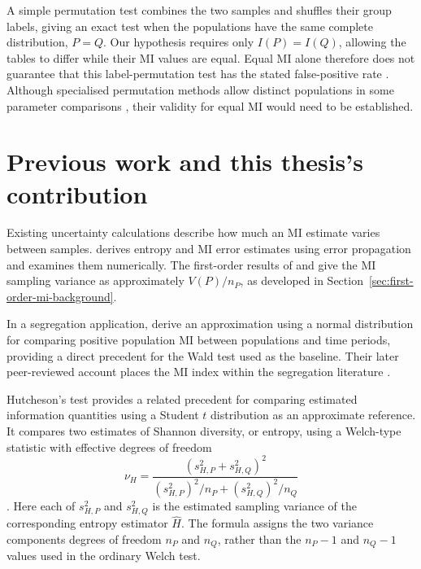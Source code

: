 A simple permutation test combines the two samples and shuffles their
group labels, giving an exact test when the populations have the same
complete distribution, \(P=Q\). Our hypothesis requires only
\(I(P)=I(Q)\), allowing the tables to differ while their MI values are
equal. Equal MI alone therefore does not guarantee that this label-permutation test
has the stated false-positive rate \citep{chung2013}.
Although specialised permutation methods allow distinct populations in
some parameter comparisons \citep{janssen1997,chung2013}, their validity
for equal MI would need to be established.

\section{Previous work and this thesis's contribution}

Existing uncertainty calculations describe how much an MI estimate varies
between samples. \citet{roulston1999} derives entropy and MI error estimates
using error propagation and examines them numerically. The first-order
results of \citet{moddemeijer1989} and \citet{brillinger2004} give the MI
sampling variance as approximately \(V(P)/n_P\), as developed in
Section~\ref{sec:first-order-mi-background}.

In a segregation application, \citet{mora2009} derive an approximation using
a normal distribution for comparing positive population MI between
populations and time periods, providing a direct precedent for the Wald
test used as the baseline. Their later
peer-reviewed account places the MI index within the segregation literature
\citep{mora2011}.

Hutcheson's test provides a related precedent for comparing estimated
information quantities using a Student \(t\) distribution as an approximate
reference. It compares two estimates of Shannon diversity, or entropy,
using a Welch-type statistic with effective degrees of freedom
\begin{equation}
  \nu_H=
  \frac{(s_{H,P}^2+s_{H,Q}^2)^2}
       {(s_{H,P}^2)^2/n_P+(s_{H,Q}^2)^2/n_Q}
  \label{eq:hutcheson-df}
\end{equation}
\citep{hutcheson1970}. Here each of
\(s_{H,P}^2\) and \(s_{H,Q}^2\) is the estimated sampling variance of the
corresponding entropy estimator \(\widehat H\). The formula assigns the
two variance components degrees of freedom \(n_P\) and \(n_Q\), rather
than the \(n_P-1\) and \(n_Q-1\) values used in the ordinary Welch test.

